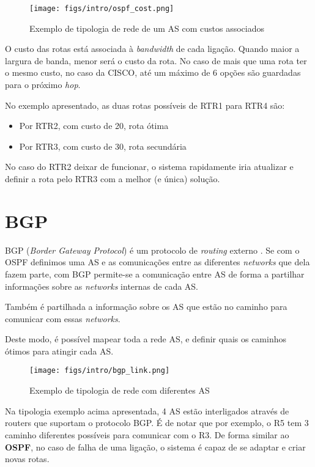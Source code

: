 \begin{figure}[H]
    \centering
    \texttt{[image: figs/intro/ospf\_cost.png]}
    \caption{Exemplo de tipologia de rede de um AS com custos associados}
    \label{fig:ospf_cost}
\end{figure}

O custo das rotas está associada à \textit{bandwidth} de cada ligação. Quando maior a largura de banda, menor será o custo da rota.
No caso de mais que uma rota ter o mesmo custo, no caso da CISCO, até um máximo de 6 opções são guardadas para o próximo \textit{hop}.

No exemplo apresentado, as duas rotas possíveis de RTR1 para RTR4 são:
\begin{itemize}
    \item Por RTR2, com custo de 20, rota ótima
    \item Por RTR3, com custo de 30, rota secundária
\end{itemize}

No caso do RTR2 deixar de funcionar, o sistema rapidamente iria atualizar e definir a rota pelo RTR3 com a melhor (e única) solução.


\section{BGP}

BGP (\textit{Border Gateway Protocol}) é um protocolo de \textit{routing} externo \cite{bgp}. 
Se com o OSPF definimos uma AS e as comunicações entre as diferentes \textit{networks} que dela fazem parte,
com BGP permite-se a comunicação entre AS de forma a partilhar informações sobre as \textit{networks} internas de cada AS.

Também é partilhada a informação sobre os AS que estão no caminho para comunicar com essas \textit{networks}.

Deste modo, é possível mapear toda a rede AS, e definir quais os caminhos ótimos para atingir cada AS.

\begin{figure}[H]
    \centering
    \texttt{[image: figs/intro/bgp\_link.png]}
    \caption{Exemplo de tipologia de rede com diferentes AS}
    \label{fig:bgp_link}
\end{figure}

Na tipologia exemplo acima apresentada, 4 AS estão interligados através de routers que suportam o protocolo BGP.
É de notar que por exemplo, o R5 tem 3 caminho diferentes possíveis para comunicar com o R3.
De forma similar ao \textbf{OSPF}, no caso de falha de uma ligação, o sistema é capaz de se adaptar e criar novas rotas.